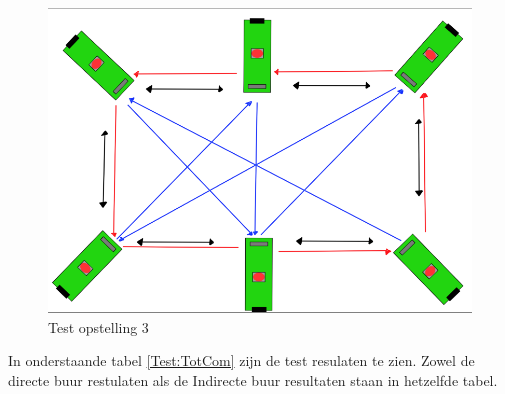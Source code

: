 \begin{figure}[h]
    \centering
    \includegraphics{img/Screenshot_294.png}
    \caption{Test opstelling 3}
    \label{fig:TestTotCom}
\end{figure}
In onderstaande tabel \ref{Test:TotCom} zijn de test resulaten te zien. Zowel de directe buur restulaten als de Indirecte buur resultaten staan 
in hetzelfde tabel.

